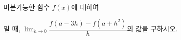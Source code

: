 미분가능한 함수 $f(x)$에 대하여 \par\smallskip{}\par\smallskip\noindent 일 때, $\displaystyle\lim_{h\to 0}\dfrac{f(a-3h)-f(a+h^2)}{h}$의 값을 구하시오.
